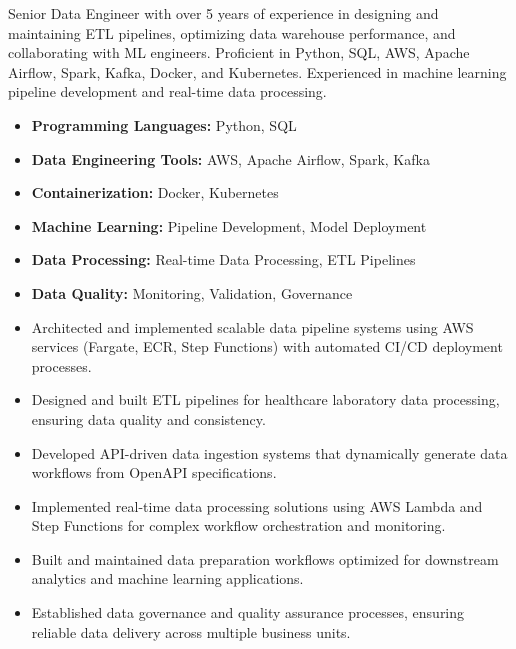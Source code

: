 \documentclass[10pt,a4paper,ragged2e,withhyper]{altacv}
\begin{document}
\makecvheader

\begin{minipage}{\textwidth}
Senior Data Engineer with over 5 years of experience in designing and maintaining ETL pipelines, optimizing data warehouse performance, and collaborating with ML engineers. Proficient in Python, SQL, AWS, Apache Airflow, Spark, Kafka, Docker, and Kubernetes. Experienced in machine learning pipeline development and real-time data processing.
\end{minipage}

\begin{itemize}[noitemsep]
\item \textbf{Programming Languages:} Python, SQL
\item \textbf{Data Engineering Tools:} AWS, Apache Airflow, Spark, Kafka
\item \textbf{Containerization:} Docker, Kubernetes
\item \textbf{Machine Learning:} Pipeline Development, Model Deployment
\item \textbf{Data Processing:} Real-time Data Processing, ETL Pipelines
\item \textbf{Data Quality:} Monitoring, Validation, Governance
\end{itemize}


\begin{itemize}[noitemsep]
\item Architected and implemented scalable data pipeline systems using AWS services (Fargate, ECR, Step Functions) with automated CI/CD deployment processes.
\item Designed and built ETL pipelines for healthcare laboratory data processing, ensuring data quality and consistency.
\item Developed API-driven data ingestion systems that dynamically generate data workflows from OpenAPI specifications.
\item Implemented real-time data processing solutions using AWS Lambda and Step Functions for complex workflow orchestration and monitoring.
\item Built and maintained data preparation workflows optimized for downstream analytics and machine learning applications.
\item Established data governance and quality assurance processes, ensuring reliable data delivery across multiple business units.
\end{itemize}
\end{document}

